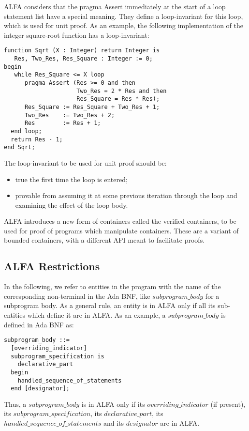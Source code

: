 \documentclass{article}
\newcommand{\bnf}[1]{$\mathit{#1}$}
\begin{document}
ALFA considers that the pragma Assert immediately at the start of a loop
statement list have a special meaning. They define a loop-invariant for this
loop, which is used for unit proof.  As an example, the following
implementation of the integer square-root function has a loop-invariant:

\begin{verbatim}
function Sqrt (X : Integer) return Integer is
   Res, Two_Res, Res_Square : Integer := 0;
begin
   while Res_Square <= X loop
      pragma Assert (Res >= 0 and then
                     Two_Res = 2 * Res and then
                     Res_Square = Res * Res);
      Res_Square := Res_Square + Two_Res + 1;
      Two_Res    := Two_Res + 2;
      Res        := Res + 1;
  end loop;
  return Res - 1;
end Sqrt;
\end{verbatim}

The loop-invariant to be used for unit proof should be:
\begin{itemize}
\item true the first time the loop is entered;
\item provable from assuming it at some previous iteration through the loop and
  examining the effect of the loop body.
\end{itemize}

ALFA introduces a new form of containers called the verified containers, to be
used for proof of programs which manipulate containers. These are a variant of
bounded containers, with a different API meant to facilitate proofs.

\subsection{ALFA Restrictions}

In the following, we refer to entities in the program with the name of the
corresponding non-terminal in the Ada BNF, like \bnf{subprogram\_body} for a
subprogram body. As a general rule, an entity is in ALFA only if all its
sub-entities which define it are in ALFA. As an example, a
\bnf{subprogram\_body} is defined in Ada BNF as:

\begin{verbatim}
subprogram_body ::=
  [overriding_indicator]
  subprogram_specification is
    declarative_part
  begin
    handled_sequence_of_statements
  end [designator];
\end{verbatim}

Thus, a \bnf{subprogram\_body} is in ALFA only if its
\bnf{overriding\_indicator} (if present), its \bnf{subprogram\_specification},
its \bnf{declarative\_part}, its \bnf{handled\_sequence\_of\_statements} and
its \bnf{designator} are in ALFA.
\end{document}
